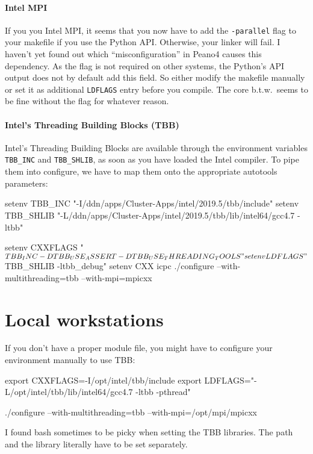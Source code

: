 \paragraph{Intel MPI}

If you you Intel MPI, it seems that you now have to add the \texttt{-parallel}
flag to your makefile if you use the Python API. Otherwise, your linker will
fail.
I haven't yet found out which ``misconfiguration'' in Peano4 causes this
dependency.
As the flag is not required on other systems, the Python's API output does not
by default add this field.
So either modify the makefile manually or set it as additional \texttt{LDFLAGS}
entry before you compile.
The core b.t.w.~seems to be fine without the flag for whatever reason.



\paragraph{Intel's Threading Building Blocks (TBB)}

Intel's Threading Building Blocks are available through the environment
variables \texttt{TBB\_INC} and \texttt{TBB\_SHLIB}, as soon as you have 
loaded the Intel compiler.
To pipe them into configure, we have to map them onto the appropriate autotools
parameters:

 
\begin{code}
 setenv TBB_INC "-I/ddn/apps/Cluster-Apps/intel/2019.5/tbb/include"
 setenv TBB_SHLIB "-L/ddn/apps/Cluster-Apps/intel/2019.5/tbb/lib/intel64/gcc4.7 -ltbb"
 
 setenv CXXFLAGS "$TBB_INC  -DTBB_USE_ASSERT -DTBB_USE_THREADING_TOOLS"
 setenv LDFLAGS "$TBB_SHLIB -ltbb_debug"
 setenv CXX icpc
 ./configure --with-multithreading=tbb --with-mpi=mpicxx
\end{code}



\section{Local workstations}
If you don't have a proper module file, you might have to configure your environment manually to use TBB:
\begin{code}
export CXXFLAGS=-I/opt/intel/tbb/include
export LDFLAGS="-L/opt/intel/tbb/lib/intel64/gcc4.7 -ltbb -pthread"

./configure --with-multithreading=tbb --with-mpi=/opt/mpi/mpicxx
\end{code}

I found bash sometimes to be picky when setting the TBB libraries. The path and the library literally have to be set separately.






